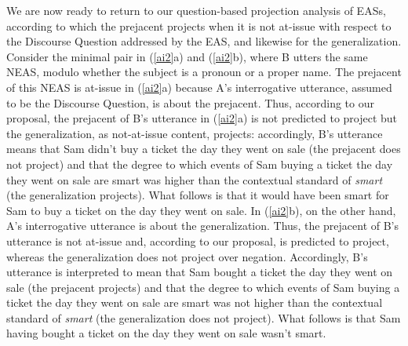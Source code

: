\documentclass[11pt,fleqn]{article}
\newcommand{\6}{\mbox{$[\hspace*{-.6mm}[$}}
\newcommand{\9}{\mbox{$]\hspace*{-.6mm}]$}}
\begin{document}
We are now ready to return to our question-based projection analysis of EASs, according to which the prejacent projects when it is not at-issue with respect to the Discourse Question addressed by the EAS, and likewise for the generalization. Consider the minimal pair in (\ref{ai2}a) and (\ref{ai2}b), where B utters the same NEAS, modulo whether the subject is a pronoun or a proper name. The prejacent of this NEAS is at-issue in (\ref{ai2}a) because A's interrogative utterance, assumed to be the Discourse Question, is about the prejacent. Thus, according to our proposal, the prejacent of B's utterance in (\ref{ai2}a) is not predicted to project but the generalization, as not-at-issue content, projects: accordingly, B's utterance means that Sam didn't buy a ticket the day they went on sale (the prejacent does not project) and that the degree to which events of Sam buying a ticket the day they went on sale are smart was higher than the contextual standard of {\em smart} (the generalization projects). What follows is that it would have been smart for Sam to buy a ticket on the day they went on sale. In (\ref{ai2}b), on the other hand, A's interrogative utterance is about the generalization. Thus, the prejacent of B's utterance is not at-issue and, according to our proposal, is predicted to project, whereas the generalization does not project over negation. Accordingly, B's utterance is interpreted to mean that Sam bought a ticket the day they went on sale (the prejacent projects) and that the degree to which events of Sam buying a ticket the day they went on sale are smart was not higher than the contextual standard of {\em smart} (the generalization does not project). What follows is that Sam having bought a ticket on the day they went on sale wasn't smart. 
\end{document}
